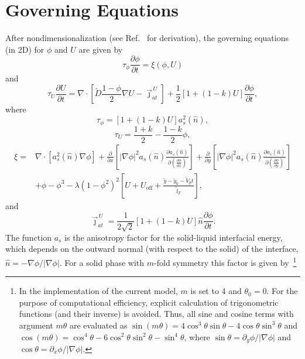 \documentclass[10pt]{article}
\begin{document}
\section{Governing Equations}
After nondimensionalization (see Ref.~\cite{Echebarria2004} for derivation), the governing equations (in 2D) for $\phi$ and $U$ are given by
\begin{equation}
\label{eqphi}
\tau_\phi\frac{\partial  \phi}{\partial  t} = \xi(\phi,U)
\end{equation}
and 
\begin{equation}
\label{eqU}
\tau_U\frac{\partial  U}{\partial  t} = \nabla \cdot \left[ \tilde{D} \frac{1-\phi}{2} \nabla U - \vec{\jmath}_{at}^{\,U} \right] + \frac{1}{2}[1+(1-k)U]\frac{\partial \phi}{\partial t},
\end{equation}
where
\begin{equation}
\label{tau_phi}
\tau_\phi=[1+(1-k) U ]a_s^2(\hat{n}),
\end{equation}
\begin{equation}
\tau_U=\frac{1+k}{2} - \frac{1-k}{2}\phi,
\label{tauU}
\end{equation}
\begin{equation}
\label{eqxi}
\begin{split}
\xi = & \nabla \cdot  \left[ a_s^2(\hat{n}) \nabla \phi \right] 
+  \frac{\partial}{\partial x} \left[ |\nabla \phi|^2 a_s(\hat{n}) \frac{\partial a_s(\hat{n})}{\partial \left( \frac{\partial \phi}{\partial x} \right)} \right]
+  \frac{\partial}{\partial y} \left[ |\nabla \phi|^2 a_s(\hat{n}) \frac{\partial a_s(\hat{n})}{\partial \left( \frac{\partial \phi}{\partial y} \right)} \right] \\
& +\phi-\phi^3 - \lambda(1-\phi^2)^2 \left[ U + U_\text{off} + \frac{\tilde{y} - \tilde{y}_0 - \tilde{V}_p t}{\tilde{l}_T} \right],
\end{split}
\end{equation}
and
\begin{equation}
\label{eqjat}
\vec{\jmath}_{at}^{\,U}=\frac{1}{2\sqrt{2}}[1+(1-k)U]\hat{n}\frac{\partial \phi}{\partial t}.
\end{equation}
The function $a_s$ is the anisotropy factor for the solid-liquid interfacial energy, which depends on the outward normal (with respect to the solid) of the interface, $\hat{n}=-\nabla \phi / |\nabla \phi|$. For a solid phase with $m$-fold symmetry this factor is given by~\footnote{In the implementation of the current model, $m$ is set to 4 and  $\theta_0=0$. For the purpose of computational efficiency, explicit calculation of trigonometric functions (and their inverse) is avoided. Thus, all sine and cosine terms with argument $m\theta$ are evaluated as $\sin(m\theta)=4\cos^3\theta\sin\theta-4\cos\theta\sin^3\theta$ and $\cos(m\theta)=\cos^4\theta -6\cos^2\theta\sin^2\theta-\sin^4\theta$, where $\sin\theta=\partial_y\phi / |\nabla \phi|$ and $\cos\theta=\partial_x\phi / |\nabla \phi|$.}
\end{document}
